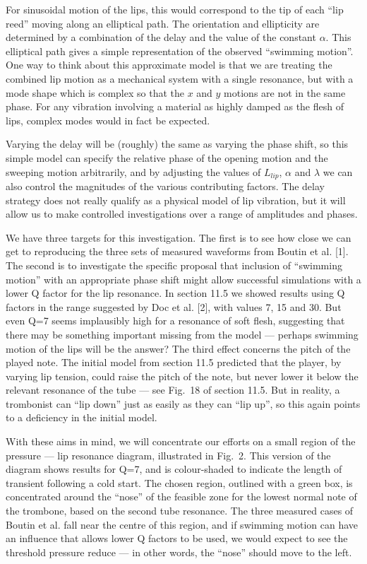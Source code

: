   For sinusoidal motion of the lips, this would correspond to the tip of each 
  ``lip reed'' moving along an elliptical path. The orientation and ellipticity 
  are determined by a combination of the delay and the value of the constant 
  $\alpha$. This elliptical path gives a simple representation of the observed 
  ``swimming motion''. One way to think about this approximate model is that we 
  are treating the combined lip motion as a mechanical system with a single 
  resonance, but with a mode shape which is complex so that the $x$ and $y$ 
  motions are not in the same phase. For any vibration involving a material as 
  highly damped as the flesh of lips, complex modes would in fact be expected. 

  Varying the delay will be (roughly) the same as varying the phase shift, so 
  this simple model can specify the relative phase of the opening motion and 
  the sweeping motion arbitrarily, and by adjusting the values of $L_{lip}$, 
  $\alpha$ and $\lambda$ we can also control the magnitudes of the various 
  contributing factors. The delay strategy does not really qualify as a 
  physical model of lip vibration, but it will allow us to make controlled 
  investigations over a range of amplitudes and phases. 

  We have three targets for this investigation. The first is to see how close 
  we can get to reproducing the three sets of measured waveforms from Boutin et 
  al. [1]. The second is to investigate the specific proposal that inclusion of 
  ``swimming motion'' with an appropriate phase shift might allow successful 
  simulations with a lower Q factor for the lip resonance. In section 11.5 we 
  showed results using Q factors in the range suggested by Doc et al. [2], with 
  values 7, 15 and 30. But even Q=7 seems implausibly high for a resonance of 
  soft flesh, suggesting that there may be something important missing from the 
  model --- perhaps swimming motion of the lips will be the answer? The third 
  effect concerns the pitch of the played note. The initial model from section 
  11.5 predicted that the player, by varying lip tension, could raise the pitch 
  of the note, but never lower it below the relevant resonance of the tube --- 
  see Fig.\ 18 of section 11.5. But in reality, a trombonist can ``lip down'' 
  just as easily as they can ``lip up'', so this again points to a deficiency 
  in the initial model. 

  With these aims in mind, we will concentrate our efforts on a small region of 
  the pressure --- lip resonance diagram, illustrated in Fig.\ 2. This version 
  of the diagram shows results for Q=7, and is colour-shaded to indicate the 
  length of transient following a cold start. The chosen region, outlined with 
  a green box, is concentrated around the ``nose'' of the feasible zone for the 
  lowest normal note of the trombone, based on the second tube resonance. The 
  three measured cases of Boutin et al. fall near the centre of this region, 
  and if swimming motion can have an influence that allows lower Q factors to 
  be used, we would expect to see the threshold pressure reduce — in other 
  words, the ``nose'' should move to the left. 

